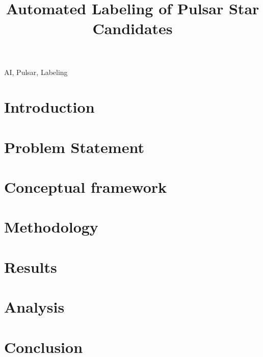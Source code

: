 \documentclass[journal]{IEEEtran}
\begin{document}
\title{Automated Labeling of Pulsar Star Candidates}

\author{
    }

\maketitle

\begin{abstract}
    
\end{abstract}

\begin{IEEEkeywords}
    AI, Pulsar, Labeling
\end{IEEEkeywords}

\section{Introduction\label{sec:intro}} 


\section{Problem Statement\label{sec:problem}}


\section{Conceptual framework\label{sec:conceptual}}


\section{Methodology\label{sec:methods}}


\section{Results\label{sec:results}}


\section{Analysis\label{sec:analysis}}


\section{Conclusion\label{sec:conclusion}}


\printbibliography
\end{document}

